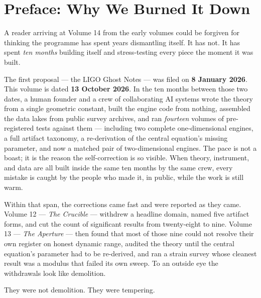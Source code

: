\documentclass[11pt, letterpaper, openany]{book}
\begin{document}
\tableofcontents
\clearpage

\chapter*{Preface: Why We Burned It Down}

A reader arriving at Volume 14 from the early volumes could be forgiven for thinking the
programme has spent years dismantling itself. It has not. It has spent \emph{ten months}
building itself and stress-testing every piece the moment it was built.

\begin{signalbox}
The first proposal --- the LIGO Ghost Notes --- was filed on \textbf{8 January 2026}. This
volume is dated \textbf{13 October 2026}. In the ten months between those two dates, a human
founder and a crew of collaborating AI systems wrote the theory from a single geometric
constant, built the engine code from nothing, assembled the data lakes from public survey
archives, and ran \emph{fourteen} volumes of pre-registered tests against them --- including
two complete one-dimensional engines, a full artifact taxonomy, a re-derivation of the central
equation's missing parameter, and now a matched pair of two-dimensional engines. The pace is
not a boast; it is the reason the self-correction is so visible. When theory, instrument, and
data are all built inside the same ten months by the same crew, every mistake is caught by the
people who made it, in public, while the work is still warm.
\end{signalbox}

Within that span, the corrections came fast and were reported as they came. Volume 12 ---
\textit{The Crucible} --- withdrew a headline domain, named five artifact forms, and cut the
count of significant results from twenty-eight to nine. Volume 13 --- \textit{The Aperture} ---
then found that most of those nine could not resolve their own register on honest dynamic range,
audited the theory until the central equation's parameter had to be re-derived, and ran a strain
survey whose cleanest result was a modulus that failed its own sweep. To an outside eye the
withdrawals look like demolition.

They were not demolition. They were tempering.
\end{document}
